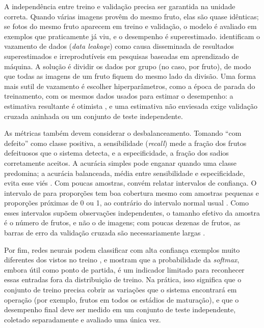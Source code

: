 A independência entre treino e validação precisa ser garantida na unidade correta. Quando várias imagens provêm do mesmo fruto, elas são quase idênticas; se fotos do mesmo fruto aparecem em treino e validação, o modelo é avaliado em exemplos que praticamente já viu, e o desempenho é superestimado. \textcite{kapoor2023} identificam o vazamento de dados (\textit{data leakage}) como causa disseminada de resultados superestimados e irreprodutíveis em pesquisas baseadas em aprendizado de máquina. A solução é dividir os dados por grupo (no caso, por fruto), de modo que todas as imagens de um fruto fiquem do mesmo lado da divisão. Uma forma mais sutil de vazamento é escolher hiperparâmetros, como a época de parada do treinamento, com os mesmos dados usados para estimar o desempenho: a estimativa resultante é otimista \cite{cawley2010}, e uma estimativa não enviesada exige validação cruzada aninhada \cite{varma2006} ou um conjunto de teste independente.

As métricas também devem considerar o desbalanceamento. Tomando ``com defeito'' como classe positiva, a sensibilidade (\textit{recall}) mede a fração dos frutos defeituosos que o sistema detecta, e a especificidade, a fração dos sadios corretamente aceitos. A acurácia simples pode enganar quando uma classe predomina; a acurácia balanceada, média entre sensibilidade e especificidade, evita esse viés \cite{brodersen2010}. Com poucas amostras, convém relatar intervalos de confiança. O intervalo de \textcite{wilson1927} para proporções tem boa cobertura mesmo com amostras pequenas e proporções próximas de 0 ou 1, ao contrário do intervalo normal usual \cite{brown2001}. Como esses intervalos supõem observações independentes, o tamanho efetivo da amostra é o número de frutos, e não o de imagens; com poucas dezenas de frutos, as barras de erro da validação cruzada são necessariamente largas \cite{varoquaux2018}.

Por fim, redes neurais podem classificar com alta confiança exemplos muito diferentes dos vistos no treino \cite{nguyen2015}, e \textcite{hendrycks2017} mostram que a probabilidade da \textit{softmax}, embora útil como ponto de partida, é um indicador limitado para reconhecer essas entradas fora da distribuição de treino. Na prática, isso significa que o conjunto de treino precisa cobrir as variações que o sistema encontrará em operação (por exemplo, frutos em todos os estádios de maturação), e que o desempenho final deve ser medido em um conjunto de teste independente, coletado separadamente e avaliado uma única vez.

